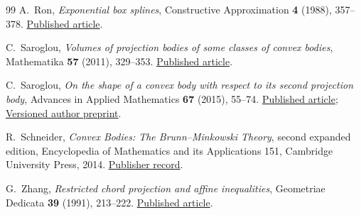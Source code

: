 \documentclass[11pt]{article}
\begin{document}
\begin{thebibliography}{99}
A.~Ron, \emph{Exponential box splines}, Constructive Approximation
\textbf{4} (1988), 357--378.
\href{https://doi.org/10.1007/BF02075467}{Published article}.

C.~Saroglou, \emph{Volumes of projection bodies of some classes of convex
bodies}, Mathematika \textbf{57} (2011), 329--353.
\href{https://doi.org/10.1112/S0025579311001860}{Published article}.

C.~Saroglou, \emph{On the shape of a convex body with respect to its
second projection body}, Advances in Applied Mathematics \textbf{67}
(2015), 55--74.
\href{https://doi.org/10.1016/j.aam.2015.03.004}{Published article};
\href{https://arxiv.org/abs/1409.4347v2}{Versioned author preprint}.

R.~Schneider, \emph{Convex Bodies: The Brunn--Minkowski Theory}, second
expanded edition, Encyclopedia of Mathematics and its Applications 151,
Cambridge University Press, 2014.
\href{https://doi.org/10.1017/CBO9781139003858}{Publisher record}.

G.~Zhang, \emph{Restricted chord projection and affine inequalities},
Geometriae Dedicata \textbf{39} (1991), 213--222.
\href{https://doi.org/10.1007/BF00182294}{Published article}.
\end{thebibliography}
\endgroup
\end{document}
